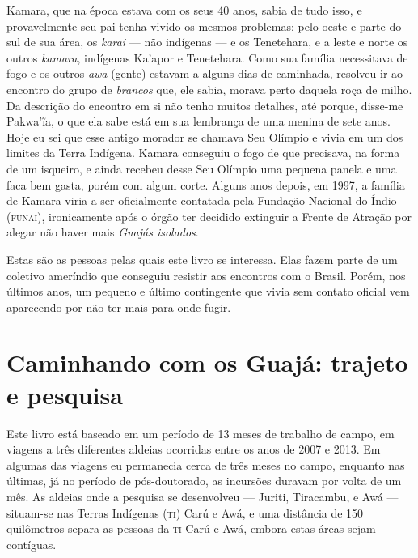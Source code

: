 Kamara, que na época estava com os seus 40 anos, sabia de tudo isso, e
provavelmente seu pai tenha vivido os mesmos problemas: pelo oeste e
parte do sul de sua área, os \textit{karai} --- não indígenas --- e os Tenetehara, e a leste e norte os outros \textit{kamara}, indígenas
Ka'apor e Tenetehara. Como sua família necessitava de fogo e os outros
\textit{awa} (gente) estavam a alguns dias de caminhada, resolveu ir ao
encontro do grupo de \textit{brancos} que, ele sabia, morava perto daquela
roça de milho. Da descrição do encontro em si não tenho muitos detalhes,
até porque, disse-me Pakwa'ĩa, o que ela sabe está em sua lembrança de
uma menina de sete anos. Hoje eu sei que esse antigo morador se chamava
Seu Olímpio e vivia em um dos limites da Terra Indígena. Kamara
conseguiu o fogo de que precisava, na forma de um isqueiro, e ainda
recebeu desse Seu Olímpio uma pequena panela e uma faca bem gasta, porém
com algum corte. Alguns anos depois, em 1997, a família de Kamara viria
a ser oficialmente contatada pela Fundação Nacional do Índio (\textsc{funai}),
ironicamente após o órgão ter decidido extinguir a Frente de Atração por
alegar não haver mais \textit{Guajás isolados}.

Estas são as pessoas pelas quais este livro se interessa. Elas fazem
parte de um coletivo ameríndio que conseguiu resistir aos encontros com
o Brasil. Porém, nos últimos anos, um pequeno e último
contingente que vivia sem contato oficial vem aparecendo por não ter
mais para onde fugir.

\section{Caminhando com os Guajá: trajeto e pesquisa}

Este livro está baseado em um período de 13 meses de trabalho de campo,
em viagens a três diferentes aldeias ocorridas entre os anos de 2007 e
2013. Em algumas das viagens eu permanecia cerca de três meses no campo,
enquanto nas últimas, já no período de pós-doutorado, as incursões
duravam por volta de um mês. As aldeias onde a pesquisa se desenvolveu --- Juriti, Tiracambu, e Awá --- situam-se nas Terras Indígenas (\textsc{ti}) Carú e Awá, e uma
distância de 150 quilômetros separa as pessoas da \textsc{ti} Carú e Awá, embora estas áreas
sejam contíguas. 

